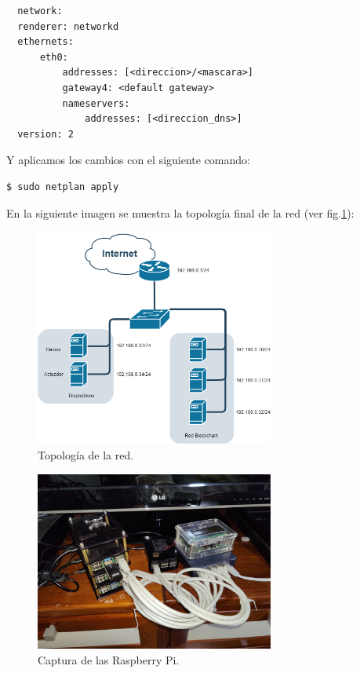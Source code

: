 \begin{lstlisting}
  network:
  renderer: networkd
  ethernets:
      eth0:
          addresses: [<direccion>/<mascara>]
          gateway4: <default gateway>
          nameservers:
              addresses: [<direccion_dns>]
  version: 2
\end{lstlisting}

\noindent Y aplicamos los cambios con el siguiente comando:

\begin{lstlisting}[language=bash]
  $ sudo netplan apply
\end{lstlisting}

\vspace{5mm}

\noindent En la siguiente imagen se muestra la topología final de la red (ver fig.\ref{fig:topologia-red}):

\begin{figure}[ht!]
  \centering
  \includegraphics[width=0.7\textwidth]{imagenes/desarrollo/topologia_red}
  \caption{Topología de la red.}
  \label{fig:topologia-red}
\end{figure}

\begin{figure}[ht!]
  \centering
  \includegraphics[width=0.7\textwidth]{imagenes/desarrollo/foto_raspberry}
  \caption{Captura de las Raspberry Pi.}
  \label{fig:captura-raspberry}
\end{figure}


